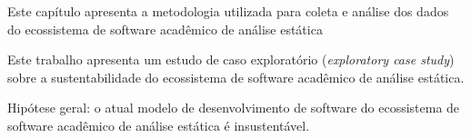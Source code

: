 {Este capítulo apresenta a metodologia utilizada para coleta e análise dos
dados do ecossistema de software acadêmico de análise estática}
\label{metodologia}

Este trabalho apresenta um estudo de caso exploratório ({\it exploratory case
study}) \cite{stol2015holistic} sobre a sustentabilidade do ecossistema de
software acadêmico de análise estática.

Hipótese geral: o atual modelo de desenvolvimento de software do ecossistema de
software acadêmico de análise estática é insustentável.









